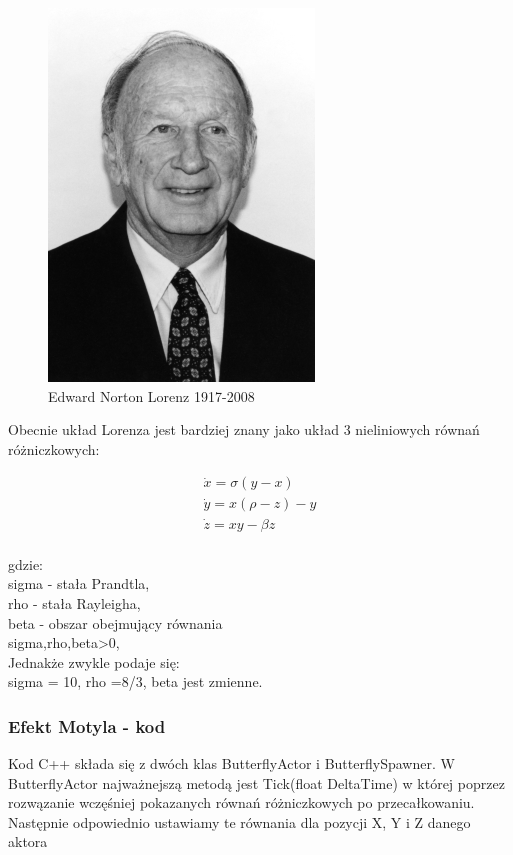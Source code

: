 \documentclass[a4paper,12pt,reqno]{article}
\begin{document}
\begin{figure}[H]%
\centering
\includegraphics[width=0.4\columnwidth]{graphics/butterfly/Edward_lorenz.jpg}
\caption{Edward Norton Lorenz 1917-2008 
\label{BPExample}}%
%
\qquad
\end{figure} 

Obecnie układ Lorenza jest bardziej znany jako układ 3 nieliniowych
równań różniczkowych:

\begin{equation}
\begin{split}
\dot{x}=\sigma(y-x)\\
\dot{y}=x(\rho-z)-y\\
\dot{z}=xy-\beta z\\
\end{split}
\end{equation}

gdzie:\\
sigma - stała Prandtla,\\
rho - stała Rayleigha,\\
beta - obszar obejmujący równania\\
sigma,rho,beta>0,\\
Jednakże zwykle podaje się:\\
sigma = 10, rho =8/3, beta jest zmienne.\\

\subsubsection{Efekt Motyla - kod}

Kod C++ składa się z dwóch klas ButterflyActor i ButterflySpawner.
W ButterflyActor najważnejszą metodą jest Tick(float DeltaTime) w której poprzez rozwązanie wczęśniej pokazanych równań różniczkowych po przecałkowaniu. Następnie odpowiednio ustawiamy te równania dla pozycji X, Y i Z danego aktora\cite{motyle_cpp}
\end{document}
